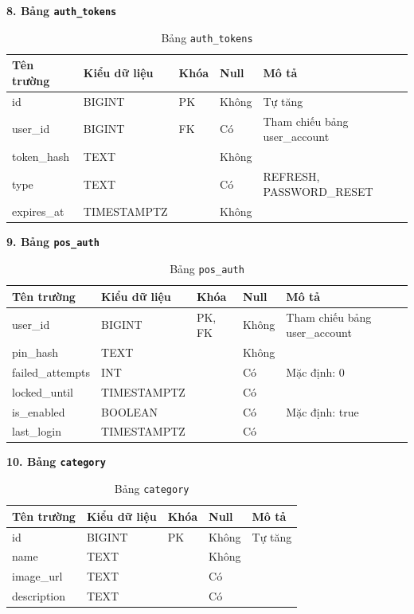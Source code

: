\documentclass[12pt,a4paper]{report}
\begin{document}
\vspace{0.3cm}
\textbf{8. Bảng \texttt{auth\_tokens}}
\vspace{0.1cm}
\begin{longtable}{|>{\ttfamily}p{3.5cm}|p{2.5cm}|p{1.5cm}|p{1.5cm}|p{5cm}|}
\caption{Bảng \texttt{auth\_tokens}} \label{tab:db_auth_tokens} \\
\hline
\normalfont\textbf{Tên trường} & \textbf{Kiểu dữ liệu} & \textbf{Khóa} & \textbf{Null} & \textbf{Mô tả} \\ \hline
id & BIGINT & PK & Không & Tự tăng \\ \hline
user\_id & BIGINT & FK & Có & Tham chiếu bảng user\_account \\ \hline
token\_hash & TEXT & & Không & \\ \hline
type & TEXT & & Có & REFRESH, PASSWORD\_RESET \\ \hline
expires\_at & TIMESTAMPTZ & & Không & \\ \hline
\end{longtable}

\vspace{0.3cm}
\textbf{9. Bảng \texttt{pos\_auth}}
\vspace{0.1cm}
\begin{longtable}{|>{\ttfamily}p{3.5cm}|p{2.5cm}|p{1.5cm}|p{1.5cm}|p{5cm}|}
\caption{Bảng \texttt{pos\_auth}} \label{tab:db_pos_auth} \\
\hline
\normalfont\textbf{Tên trường} & \textbf{Kiểu dữ liệu} & \textbf{Khóa} & \textbf{Null} & \textbf{Mô tả} \\ \hline
user\_id & BIGINT & PK, FK & Không & Tham chiếu bảng user\_account \\ \hline
pin\_hash & TEXT & & Không & \\ \hline
failed\_attempts & INT & & Có & Mặc định: 0 \\ \hline
locked\_until & TIMESTAMPTZ & & Có & \\ \hline
is\_enabled & BOOLEAN & & Có & Mặc định: true \\ \hline
last\_login & TIMESTAMPTZ & & Có & \\ \hline
\end{longtable}


\textbf{10. Bảng \texttt{category}}
\vspace{0.1cm}
\begin{longtable}{|>{\ttfamily}p{3.5cm}|p{2.5cm}|p{1.5cm}|p{1.5cm}|p{5cm}|}
\caption{Bảng \texttt{category}} \label{tab:db_category} \\
\hline
\normalfont\textbf{Tên trường} & \textbf{Kiểu dữ liệu} & \textbf{Khóa} & \textbf{Null} & \textbf{Mô tả} \\ \hline
id & BIGINT & PK & Không & Tự tăng \\ \hline
name & TEXT & & Không & \\ \hline
image\_url & TEXT & & Có & \\ \hline
description & TEXT & & Có & \\ \hline
\end{longtable}
\end{document}
